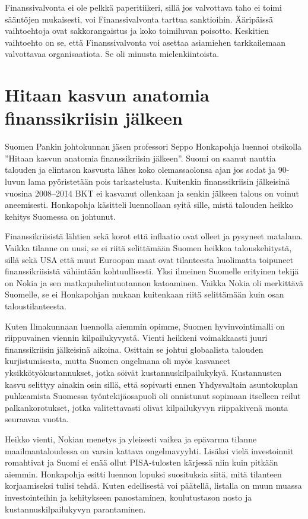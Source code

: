 \documentclass[12pt]{article}
\begin{document}
Finanssivalvonta ei ole pelkkä paperitiikeri, sillä jos valvottava taho ei toimi sääntöjen mukaisesti, voi Finanssivalvonta tarttua sanktioihin. Ääripäissä vaihtoehtoja ovat sakkorangaistus ja koko toimiluvan poisotto. Keskitien vaihtoehto on se, että Finanssivalvonta voi asettaa asiamiehen tarkkailemaan valvottavaa organisaatiota. Se oli minusta mielenkiintoista.


\newpage
\section{Hitaan kasvun anatomia finanssikriisin jäl\-keen}

Suomen Pankin johtokunnan jäsen professori Seppo Honkapohja luennoi otsikolla ''Hitaan kasvun anatomia finanssikriisin jälkeen''. Suomi on saanut nauttia talouden ja elintason kasvusta lähes koko olemassaolonsa ajan jos sodat ja 90-luvun lama pyöristetään pois tarkastelusta. Kuitenkin finanssikriisin jälkeisinä vuosina 2008--2014 BKT ei kasvanut ollenkaan ja senkin jälkeen talous on voinut aneemisesti. Honkapohja käsitteli luennollaan syitä sille, mistä talouden heikko kehitys Suomessa on johtunut.

Finanssikriisistä lähtien sekä korot että inflaatio ovat olleet ja pysyneet matalana. Vaikka tilanne on uusi, se ei riitä selittämään Suomen heikkoa talouskehitystä, sillä sekä USA että muut Euroopan maat ovat tilanteesta huolimatta toipuneet finanssikriisistä vähiintään kohtuullisesti. Yksi ilmeinen Suomelle erityinen tekijä on Nokia ja sen matkapuhelintuotannon katoaminen. Vaikka Nokia oli merkittävä Suomelle, se ei Honkapohjan mukaan kuitenkaan riitä selittämään kuin osan taloustilanteesta.

Kuten Ilmakunnaan luennolla aiemmin opimme, Suomen hyvinvointimalli on riippuvainen viennin kilpailukyvystä. Vienti heikkeni voimakkaasti juuri finanssikriisin jälkeisinä aikoina. Osittain se johtui globaalista talouden kurjistumisesta, mutta Suomen ongelmana oli myös kasvaneet yksikkötyökustannukset, jotka söivät kustannuskilpailukykyä. Kustannusten kasvu selittyy ainakin osin sillä, että sopivasti ennen Yhdysvaltain asuntokuplan puhkeamista Suomessa työntekijäosapuoli oli onnistunut sopimaan itselleen reilut palkankorotukset, jotka valitettavasti olivat kilpailukyvyn riippakivenä monta seuraavaa vuotta.

Heikko vienti, Nokian menetys ja yleisesti vaikea ja epävarma tilanne maailmantaloudessa on varsin kattava ongelmavyyhti. Lisäksi vielä investoinnit romahtivat ja Suomi ei enää ollut PISA-tulosten kärjessä niin kuin pitkään aiemmin. Honkapohja esitti luennon lopuksi suosituksia siitä, mitä tilanteen korjaamiseksi tulisi tehdä. Kuten edellisestä voi päätellä, listalla on muun muassa investointeihin ja kehitykseen panostaminen, koulutustason nosto ja kustannuskilpailukyvyn parantaminen.
\end{document}
